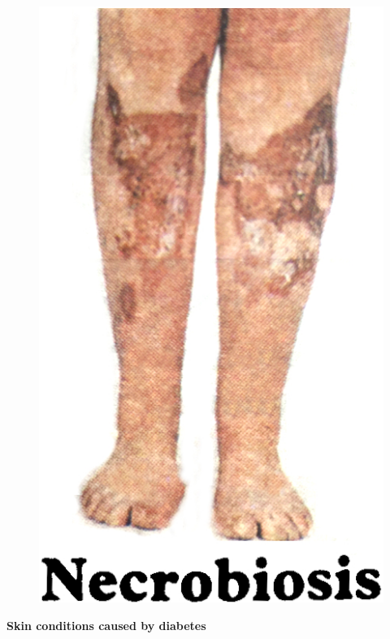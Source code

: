 \begin{figure}[h]
\centering
\includegraphics[scale=1.1]{images/072.jpg}
\end{figure}

\vskip 9pt

\textbf{Skin conditions caused by diabetes}

\vskip 5pt

